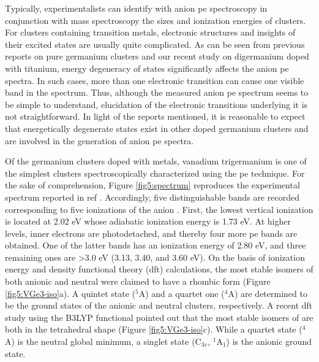 \begin{refsection}
Typically, experimentalists can identify with anion \acrshort{pe} spectroscopy in conjunction with mass spectroscopy the sizes and ionization energies of clusters. For clusters containing transition metals, electronic structures and insights of their excited states are usually quite complicated. As can be seen from previous reports \cite{c5:13, c5:14, c5:15} on pure germanium clusters and our recent study on digermanium doped with titanium, \cite{c5:16} energy degeneracy of states significantly affects the anion \acrshort{pe} spectra. In such cases, more than one electronic transition can cause one visible band in the spectrum. Thus, although the measured anion \acrshort{pe} spectrum seems to be simple to understand, elucidation of the electronic transitions underlying it is not straightforward. In light of the reports mentioned, it is reasonable to expect that energetically degenerate states exist in other doped germanium clusters and are involved in the generation of anion \acrshort{pe} spectra.





Of the germanium clusters doped with metals, vanadium trigermanium is one of the simplest clusters spectroscopically characterized using the \acrshort{pe} technique. \cite{c5:6} For the sake of comprehension, Figure \ref{fig5:spectrum} reproduces the experimental spectrum reported in ref . Accordingly, five distinguishable bands are recorded corresponding to five ionizations of the anion . First, the lowest vertical ionization is located at 2.02 eV whose adiabatic ionization energy is 1.73 eV. At higher levels, inner electrons are photodetached, and thereby four more \acrshort{pe} bands are obtained. One of the latter bands has an ionization energy of 2.80 eV, and three remaining ones are >3.0 eV (3.13, 3.40, and 3.60 eV). On the basis of ionization energy and density functional theory (\acrshort{dft}) calculations, the most stable isomers of both anionic and neutral  were claimed to have a rhombic form (Figure \ref{fig5:VGe3-iso}a). A quintet state ($^5$A) and a quartet one ($^4$A) are determined to be the ground states of the anionic and neutral clusters, respectively. \cite{c5:6} A recent \acrshort{dft} study using the B3LYP functional \cite{c5:17} pointed out that the most stable isomers of  are both in the tetrahedral shape (Figure \ref{fig5:VGe3-iso}c). While a quartet state ($^4$A) is the neutral global minimum, a singlet state (C$_{3v}$, $^1$A$_1$) is the anionic ground state.








\end{refsection}
